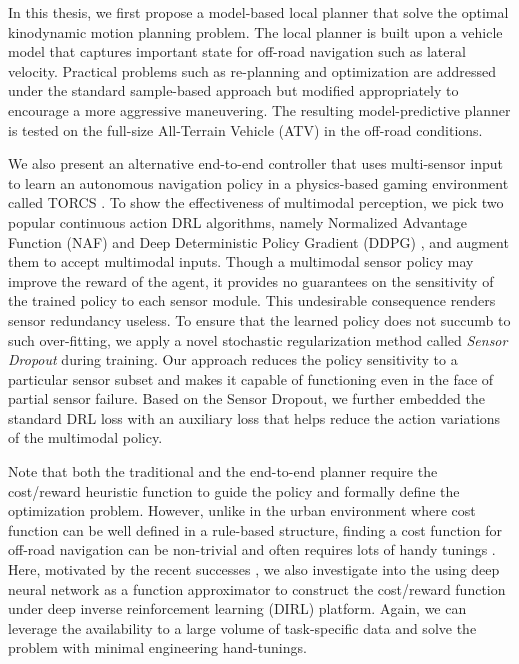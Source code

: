 \documentclass[../thesis.tex]{subfiles}
\begin{document}
In this thesis, we first propose a model-based local planner that solve the optimal kinodynamic motion planning problem. 
The local planner is built upon a vehicle model that captures important state for off-road navigation such as lateral velocity. 
Practical problems such as re-planning and optimization are addressed under the standard sample-based approach but modified appropriately to encourage a more aggressive maneuvering. 
The resulting model-predictive planner is tested on the full-size All-Terrain Vehicle (ATV) in the off-road conditions.
 
We also present an alternative end-to-end controller that uses multi-sensor input to learn an autonomous navigation policy in a physics-based gaming environment called TORCS \cite{wymann2000torcs}. 
To show the effectiveness of multimodal perception, we pick two popular continuous action DRL algorithms, namely Normalized Advantage Function (NAF) \cite{CDQN} and Deep Deterministic Policy Gradient (DDPG) \cite{DBLP:journals/corr/LillicrapHPHETS15}, and augment them to accept multimodal inputs. 
Though a multimodal sensor policy may improve the reward of the agent, it provides no guarantees on the sensitivity of the trained policy to each sensor module.
This undesirable consequence renders sensor redundancy useless. 
To ensure that the learned policy does not succumb to such over-fitting, we apply a novel stochastic regularization method called \emph{Sensor Dropout} during training. 
Our approach reduces the policy sensitivity to a particular sensor subset and makes it capable of functioning even in the face of partial sensor failure. 
Based on the Sensor Dropout, we further embedded the standard DRL loss with an auxiliary loss that helps reduce the action variations of the multimodal policy. 
 
Note that both the traditional and the end-to-end planner require the cost/reward heuristic function to guide the policy and formally define the optimization problem. 
However, unlike in the urban environment where cost function can be well defined in a rule-based structure, finding a cost function for off-road navigation can be non-trivial and often requires lots of handy tunings \cite{silver2010learning}. 
Here, motivated by the recent successes \cite{wulfmeier2015maximum,wulfmeier2016watch}, we also investigate into the using deep neural network as a function approximator to construct the cost/reward function under deep inverse reinforcement learning (DIRL) platform. 
Again, we can leverage the availability to a large volume of task-specific data and solve the problem with minimal engineering hand-tunings.
 
\end{document}
